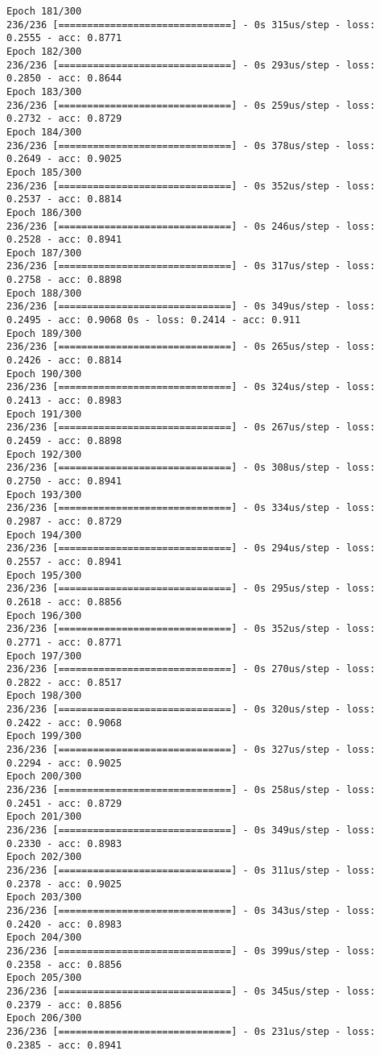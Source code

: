 \documentclass[11pt]{article}
\begin{document}
\begin{Verbatim}[commandchars=\\\{\}]
Epoch 181/300
236/236 [==============================] - 0s 315us/step - loss: 0.2555 - acc: 0.8771
Epoch 182/300
236/236 [==============================] - 0s 293us/step - loss: 0.2850 - acc: 0.8644
Epoch 183/300
236/236 [==============================] - 0s 259us/step - loss: 0.2732 - acc: 0.8729
Epoch 184/300
236/236 [==============================] - 0s 378us/step - loss: 0.2649 - acc: 0.9025
Epoch 185/300
236/236 [==============================] - 0s 352us/step - loss: 0.2537 - acc: 0.8814
Epoch 186/300
236/236 [==============================] - 0s 246us/step - loss: 0.2528 - acc: 0.8941
Epoch 187/300
236/236 [==============================] - 0s 317us/step - loss: 0.2758 - acc: 0.8898
Epoch 188/300
236/236 [==============================] - 0s 349us/step - loss: 0.2495 - acc: 0.9068 0s - loss: 0.2414 - acc: 0.911
Epoch 189/300
236/236 [==============================] - 0s 265us/step - loss: 0.2426 - acc: 0.8814
Epoch 190/300
236/236 [==============================] - 0s 324us/step - loss: 0.2413 - acc: 0.8983
Epoch 191/300
236/236 [==============================] - 0s 267us/step - loss: 0.2459 - acc: 0.8898
Epoch 192/300
236/236 [==============================] - 0s 308us/step - loss: 0.2750 - acc: 0.8941
Epoch 193/300
236/236 [==============================] - 0s 334us/step - loss: 0.2987 - acc: 0.8729
Epoch 194/300
236/236 [==============================] - 0s 294us/step - loss: 0.2557 - acc: 0.8941
Epoch 195/300
236/236 [==============================] - 0s 295us/step - loss: 0.2618 - acc: 0.8856
Epoch 196/300
236/236 [==============================] - 0s 352us/step - loss: 0.2771 - acc: 0.8771
Epoch 197/300
236/236 [==============================] - 0s 270us/step - loss: 0.2822 - acc: 0.8517
Epoch 198/300
236/236 [==============================] - 0s 320us/step - loss: 0.2422 - acc: 0.9068
Epoch 199/300
236/236 [==============================] - 0s 327us/step - loss: 0.2294 - acc: 0.9025
Epoch 200/300
236/236 [==============================] - 0s 258us/step - loss: 0.2451 - acc: 0.8729
Epoch 201/300
236/236 [==============================] - 0s 349us/step - loss: 0.2330 - acc: 0.8983
Epoch 202/300
236/236 [==============================] - 0s 311us/step - loss: 0.2378 - acc: 0.9025
Epoch 203/300
236/236 [==============================] - 0s 343us/step - loss: 0.2420 - acc: 0.8983
Epoch 204/300
236/236 [==============================] - 0s 399us/step - loss: 0.2358 - acc: 0.8856
Epoch 205/300
236/236 [==============================] - 0s 345us/step - loss: 0.2379 - acc: 0.8856
Epoch 206/300
236/236 [==============================] - 0s 231us/step - loss: 0.2385 - acc: 0.8941

\end{Verbatim}
\end{document}

